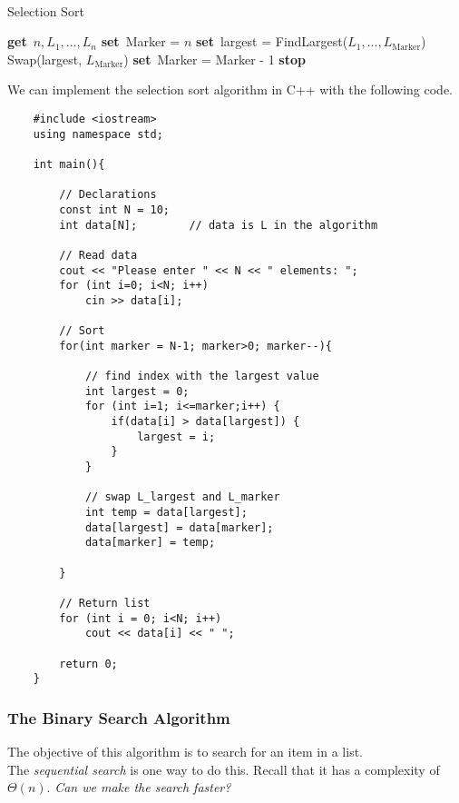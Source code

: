 \documentclass[]{article}
\newcommand{\Get}{\State \textbf{get}~}
\newcommand{\Set}{\State \textbf{set}~}
\newcommand{\Stop}{\State \textbf{stop}~}
\begin{document}
\begin{algorithm}
	\caption{\\Selection Sort}
	\begin{algorithmic}[1]
		\Get $n, L_1, ..., L_n$
		\Set Marker = $n$
		\Set largest = FindLargest($L_1, ..., L_{\mathrm{Marker}}$)
		\State Swap(largest, $L_{\mathrm{Marker}}$)
		\Set Marker = Marker - 1
		\EndWhile
		\Stop
	\end{algorithmic}
\end{algorithm}

We can implement the selection sort algorithm in C++ with the following code.

\begin{lstlisting}
	#include <iostream>
	using namespace std;
	
	int main(){
		
		// Declarations
		const int N = 10;
		int data[N];		// data is L in the algorithm
		
		// Read data
		cout << "Please enter " << N << " elements: ";
		for (int i=0; i<N; i++)
			cin >> data[i];
		
		// Sort
		for(int marker = N-1; marker>0; marker--){
			
			// find index with the largest value
			int largest = 0;
			for (int i=1; i<=marker;i++) {	
				if(data[i] > data[largest]) {
					largest = i;
				}
			}
		
			// swap L_largest and L_marker
			int temp = data[largest];
			data[largest] = data[marker];
			data[marker] = temp;
			
		}
		
		// Return list
		for (int i = 0; i<N; i++)
			cout << data[i] << " ";
		
		return 0;
	}
\end{lstlisting}\bigbreak



\subsubsection{The Binary Search Algorithm} \label{binarysearch}
\bigbreak

The objective of this algorithm is to search for an item in a list.\\

The \textit{sequential search} is one way to do this. Recall that it has a complexity of $\Theta(n)$. \textit{Can we make the search faster?}\\
\end{document}
